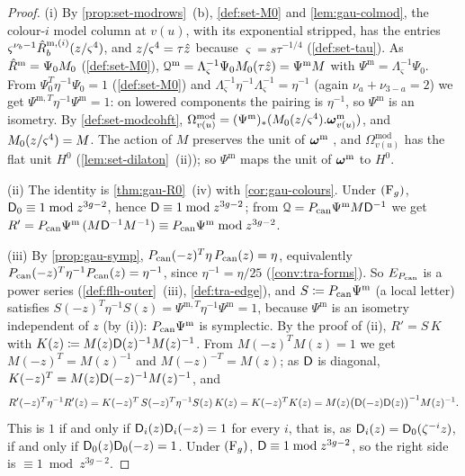 \begin{proof}
(i) By \cref{prop:set-modrows}~(b), \cref{def:set-M0} and \cref{lem:gau-colmod}, the colour-$i$ model column at $v(u)$, with its exponential stripped, has the entries $\varsigma^{\nu_b-1}\hat{R}^{\mathrm m,(i)}_b(z/\varsigma^4)$, and $z/\varsigma^4=\tau\hat{z}$ because $\varsigma=s\tau^{-1/4}$ (\cref{def:set-tau}). As $\hat{R}^{\mathrm m}=\Psi_0M_{0}$ (\cref{def:set-M0}), $\mathcal{Q}^{\mathrm m}=\Lambda_\varsigma^{-1}\Psi_0M_{0}(\tau\hat{z})=\Psi^{\mathrm m}M$ with $\Psi^{\mathrm m}=\Lambda_\varsigma^{-1}\Psi_0$. From $\Psi_0^T\eta^{-1}\Psi_0=1$ (\cref{def:set-M0}) and $\Lambda_\varsigma^{-1}\eta^{-1}\Lambda_\varsigma^{-1}=\eta^{-1}$ (again $\nu_a+\nu_{3-a}=2$) we get $\Psi^{\mathrm m,T}\eta^{-1}\Psi^{\mathrm m}=1$: on lowered components the pairing is $\eta^{-1}$, so $\Psi^{\mathrm m}$ is an isometry. By \cref{def:set-modcohft}, $\Omega^{\mathrm{mod}}_{v(u)}=(\Psi^{\mathrm m})_*(M_{0}(z/\varsigma^4).\boldsymbol{\omega}^{\mathrm m}_{v(u)})$, and $M_{0}(z/\varsigma^4)=M$. The action of $M$ preserves the unit of $\boldsymbol{\omega}^{\mathrm m}$ \cite[Prop.~2.12]{PPZ15}, and $\Omega^{\mathrm{mod}}_{v(u)}$ has the flat unit $H^0$ (\cref{lem:set-dilaton}~(ii)); so $\Psi^{\mathrm m}$ maps the unit of $\boldsymbol{\omega}^{\mathrm m}$ to $H^0$.

(ii) The identity is \cref{thm:gau-R0}~(iv) with \cref{cor:gau-colours}. Under $(\mathrm{F}_{g})$, $\mathsf{D}_0\equiv1\bmod z^{3g-2}$, hence $\mathsf{D}\equiv1\bmod z^{3g-2}$; from $\mathcal{Q}=P_{\mathrm{can}}\Psi^{\mathrm m}M\mathsf{D}^{-1}$ we get $R'=P_{\mathrm{can}}\Psi^{\mathrm m}\,(M\mathsf{D}^{-1}M^{-1})\equiv P_{\mathrm{can}}\Psi^{\mathrm m}\bmod z^{3g-2}$.

(iii) By \cref{prop:gau-symp}, $P_{\mathrm{can}}(-z)^T\eta\,P_{\mathrm{can}}(z)=\eta$, equivalently $P_{\mathrm{can}}(-z)^T\eta^{-1}P_{\mathrm{can}}(z)=\eta^{-1}$, since $\eta^{-1}=\eta/25$ (\cref{conv:tra-forms}). So $E_{P_{\mathrm{can}}}$ is a power series (\cref{def:flh-outer}~(iii), \cref{def:tra-edge}), and $S\coloneqq P_{\mathrm{can}}\Psi^{\mathrm m}$ (a local letter) satisfies $S(-z)^T\eta^{-1}S(z)=\Psi^{\mathrm m,T}\eta^{-1}\Psi^{\mathrm m}=1$, because $\Psi^{\mathrm m}$ is an isometry independent of $z$ (by (i)): $P_{\mathrm{can}}\Psi^{\mathrm m}$ is symplectic. By the proof of (ii), $R'=S\,K$ with $K(z)\coloneqq M(z)\mathsf{D}(z)^{-1}M(z)^{-1}$. From $M(-z)^TM(z)=1$ we get $M(-z)^T=M(z)^{-1}$ and $M(-z)^{-T}=M(z)$; as $\mathsf{D}$ is diagonal, $K(-z)^T=M(z)\mathsf{D}(-z)^{-1}M(z)^{-1}$, and
\[
R'(-z)^T\eta^{-1}R'(z)=K(-z)^T\,S(-z)^T\eta^{-1}S(z)\,K(z)=K(-z)^TK(z)=M(z)\bigl(\mathsf{D}(-z)\mathsf{D}(z)\bigr)^{-1}M(z)^{-1}.
\]
This is $1$ if and only if $\mathsf{D}_i(z)\mathsf{D}_i(-z)=1$ for every $i$, that is, as $\mathsf{D}_i(z)=\mathsf{D}_0(\zeta^{-i}z)$, if and only if $\mathsf{D}_0(z)\mathsf{D}_0(-z)=1$. Under $(\mathrm{F}_{g})$, $\mathsf{D}\equiv1\bmod z^{3g-2}$, so the right side is $\equiv1\bmod z^{3g-2}$.


\end{proof}
